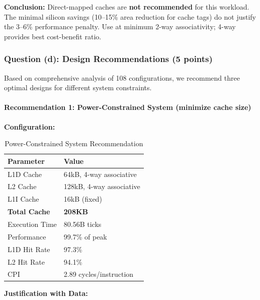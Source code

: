 \documentclass[11pt,a4paper]{article}
\begin{document}
\textbf{Conclusion:} Direct-mapped caches are \textbf{not recommended} for this workload. The minimal silicon savings (10--15\% area reduction for cache tags) do not justify the 3--6\% performance penalty. Use at minimum 2-way associativity; 4-way provides best cost-benefit ratio.

\subsubsection{Question (d): Design Recommendations (5 points)}

Based on comprehensive analysis of 108 configurations, we recommend three optimal designs for different system constraints.

\paragraph{Recommendation 1: Power-Constrained System (minimize cache size)}

\textbf{Configuration:}

\begin{table}[H]
\centering
\caption{Power-Constrained System Recommendation}
\begin{tabular}{ll}
\toprule
\textbf{Parameter} & \textbf{Value} \\
\midrule
L1D Cache & 64kB, 4-way associative \\
L2 Cache & 128kB, 4-way associative \\
L1I Cache & 16kB (fixed) \\
\textbf{Total Cache} & \textbf{208KB} \\
\midrule
Execution Time & 80.56B ticks \\
Performance & 99.7\% of peak \\
L1D Hit Rate & 97.3\% \\
L2 Hit Rate & 94.1\% \\
CPI & 2.89 cycles/instruction \\
\bottomrule
\end{tabular}
\end{table}

\textbf{Justification with Data:}
\end{document}
